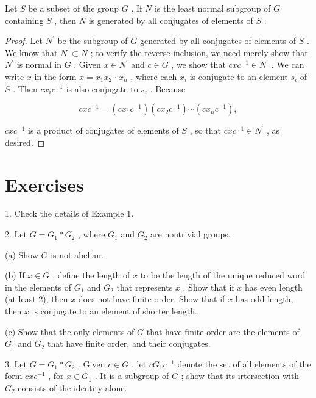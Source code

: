 \begin{lemma} Let \(S\) be a subset of the group \(G\) . If \(N\) is the least normal subgroup of \(G\) containing \(S\) , then \(N\) is generated by all conjugates of elements of \(S\) .
\end{lemma}

\begin{proof}Let \({N}^{\prime }\) be the subgroup of \(G\) generated by all conjugates of elements of \(S\) . We know that \({N}^{\prime } \subset  N\) ; to verify the reverse inclusion, we need merely show that \({N}^{\prime }\) is normal in \(G\) . Given \(x \in  {N}^{\prime }\) and \(c \in  G\) , we show that \({cx}{c}^{-1} \in  {N}^{\prime }\) .
We can write \(x\) in the form \(x = {x}_{1}{x}_{2}\cdots {x}_{n}\) , where each \({x}_{i}\) is conjugate to an element \({s}_{i}\) of \(S\) . Then \(c{x}_{i}{c}^{-1}\) is also conjugate to \({s}_{i}\) . Because

\[
{cx}{c}^{-1} = \left( {c{x}_{1}{c}^{-1}}\right) \left( {c{x}_{2}{c}^{-1}}\right) \cdots \left( {c{x}_{n}{c}^{-1}}\right) ,
\]

\({cx}{c}^{-1}\) is a product of conjugates of elements of \(S\) , so that \({cx}{c}^{-1} \in  {N}^{\prime }\) , as desired.
\end{proof}
\section*{Exercises}

1. Check the details of Example 1.

2. Let \(G = {G}_{1} * {G}_{2}\) , where \({G}_{1}\) and \({G}_{2}\) are nontrivial groups.

(a) Show \(G\) is not abelian.

(b) If \(x \in  G\) , define the length of \(x\) to be the length of the unique reduced word in the elements of \({G}_{1}\) and \({G}_{2}\) that represents \(x\) . Show that if \(x\) has even length (at least 2), then \(x\) does not have finite order. Show that if \(x\) has odd length, then \(x\) is conjugate to an element of shorter length.

(c) Show that the only elements of \(G\) that have finite order are the elements of \({G}_{1}\) and \({G}_{2}\) that have finite order, and their conjugates.

3. Let \(G = {G}_{1} * {G}_{2}\) . Given \(c \in  G\) , let \(c{G}_{1}{c}^{-1}\) denote the set of all elements of the form \({cx}{c}^{-1}\) , for \(x \in  {G}_{1}\) . It is a subgroup of \(G\) ; show that its irtersection with \({G}_{2}\) consists of the identity alone.

